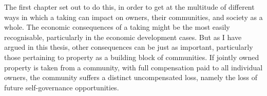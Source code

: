 




The first chapter set out to do this, in order to get at the multitude of different ways in which a taking can impact on owners, their communities, and society as a whole. The economic consequences of a taking might be the most easily recognisable, particularly in the economic development cases. But as I have argued in this thesis, other consequences can be just as important, particularly those pertaining to property as a building block of communities. If jointly owned property is taken from a community, with full compensation paid to all individual owners, the community suffers a distinct uncompensated loss, namely the loss of future self-governance opportunities.


